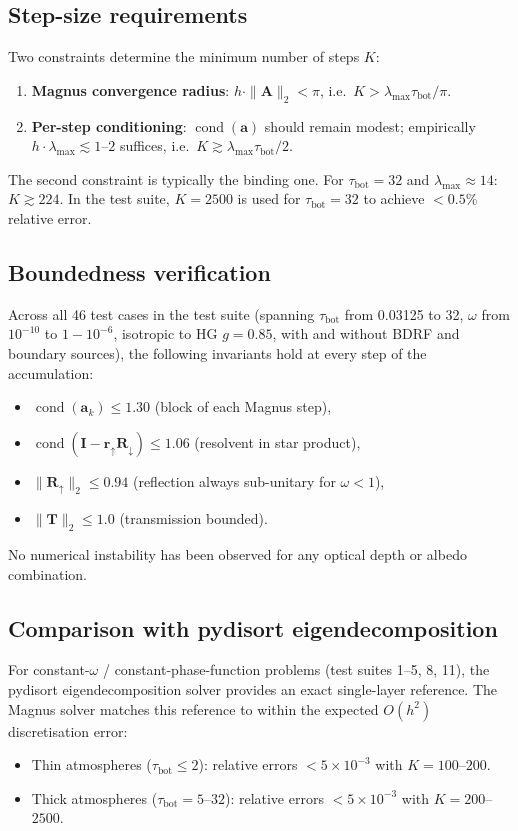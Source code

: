 \documentclass[11pt,a4paper]{article}
\newcommand{\cond}{\operatorname{cond}}
\newcommand{\mat}[1]{\mathbf{#1}}
\newcommand{\tbot}{\tau_{\mathrm{bot}}}
\theoremstyle{definition}
\begin{document}
\subsection{Step-size requirements}

Two constraints determine the minimum number of steps $K$:
\begin{enumerate}[nosep]
\item \textbf{Magnus convergence radius}: $h\cdot\|\mat{A}\|_2 < \pi$,
  i.e.\ $K > \lambda_{\max}\tbot/\pi$.
\item \textbf{Per-step conditioning}: $\cond(\mat{a})$ should remain
  modest; empirically $h\cdot\lambda_{\max}\lesssim 1$--$2$ suffices,
  i.e.\ $K \gtrsim \lambda_{\max}\tbot/2$.
\end{enumerate}
The second constraint is typically the binding one.  For $\tbot=32$ and
$\lambda_{\max}\approx 14$: $K\gtrsim 224$.  In the test suite,
$K=2500$ is used for $\tbot=32$ to achieve $<0.5\%$ relative error.

\subsection{Boundedness verification}

Across all 46 test cases in the test suite (spanning $\tbot$ from
0.03125 to 32, $\omega$ from $10^{-10}$ to $1\!-\!10^{-6}$, isotropic
to HG $g\!=\!0.85$, with and without BDRF and boundary sources), the
following invariants hold at every step of the accumulation:
\begin{itemize}[nosep]
\item $\cond(\mat{a}_k) \leq 1.30$
  (block of each Magnus step),
\item $\cond(\mat{I}-\mat{r}_\uparrow\mat{R}_\downarrow) \leq 1.06$
  (resolvent in star product),
\item $\|\mat{R}_\uparrow\|_2 \leq 0.94$
  (reflection always sub-unitary for $\omega<1$),
\item $\|\mat{T}\|_2 \leq 1.0$
  (transmission bounded).
\end{itemize}
No numerical instability has been observed for any optical depth or
albedo combination.

\subsection{Comparison with pydisort eigendecomposition}

For constant-$\omega$ / constant-phase-function problems (test suites
1--5, 8, 11), the pydisort eigendecomposition solver provides an exact
single-layer reference.  The Magnus solver matches this reference
to within the expected $O(h^2)$ discretisation error:
\begin{itemize}[nosep]
\item Thin atmospheres ($\tbot\leq 2$): relative errors $< 5\times 10^{-3}$
  with $K=100$--$200$.
\item Thick atmospheres ($\tbot=5$--$32$): relative errors $< 5\times 10^{-3}$
  with $K=200$--$2500$.
\end{itemize}
\end{document}
